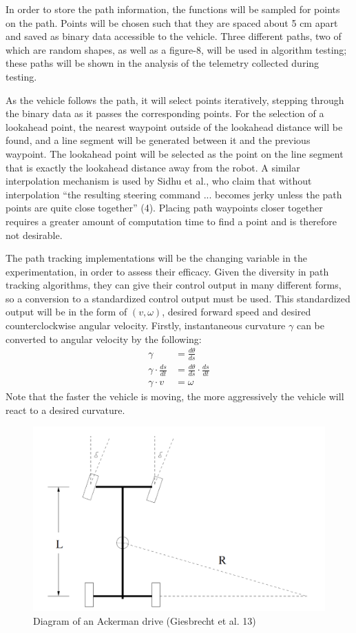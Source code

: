 \documentclass[mla8alt]{mla}
\begin{document}
\begin{paper}
In order to store the path information, the functions will be sampled for points on the path. Points will be chosen such that they are spaced about 5 cm apart and saved as binary data accessible to the vehicle. Three different paths, two of which are random shapes, as well as a figure-8, will be used in algorithm testing; these paths will be shown in the analysis of the telemetry collected during testing.

As the vehicle follows the path, it will select points iteratively, stepping through the binary data as it passes the corresponding points. For the selection of a lookahead point, the nearest waypoint outside of the lookahead distance will be found, and a line segment will be generated between it and the previous waypoint. The lookahead point will be selected as the point on the line segment that is exactly the lookahead distance away from the robot. A similar interpolation mechanism is used by Sidhu et al., who claim that without interpolation ``the resulting steering command ... becomes jerky unless the path points are quite close together'' (4). Placing path waypoints closer together requires a greater amount of computation time to find a point and is therefore not desirable. 

The path tracking implementations will be the changing variable in the experimentation, in order to assess their efficacy. Given the diversity in path tracking algorithms, they can give their control output in many different forms, so a conversion to a standardized control output must be used. This standardized output will be in the form of $(v,\omega)$, desired forward speed and desired counterclockwise angular velocity. Firstly, instantaneous curvature $\gamma$ can be converted to angular velocity by the following:
\begin{subequations}
\begin{align}
\gamma &= \frac{d\theta}{ds} \\
\gamma \cdot \frac{ds}{dt} &= \frac{d\theta}{ds} \cdot \frac{ds}{dt} \\
\gamma \cdot v &= \omega \label{eqn:gamma2omega}
\end{align}
\end{subequations}
Note that the faster the vehicle is moving, the more aggressively the vehicle will react to a desired curvature.

\begin{figure}[H]
\includegraphics[width=0.6\linewidth]{GiesbrechtAckermanDiagram}
\captionsetup{justification=centering}
\caption{Diagram of an Ackerman drive (Giesbrecht et al. 13)}
\label{img:ackerman1}
\end{figure}


\end{paper}
\end{document}
